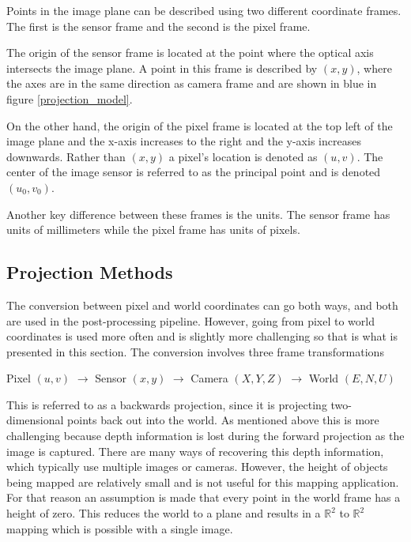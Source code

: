  Points in the image plane can be described using two different coordinate frames.  The first is the sensor frame and the second is the pixel frame.  
 
 The origin of the sensor frame is located at the point where the optical axis intersects the image plane.  A point in this frame is described by $(x,y)$, where the axes are in the same direction as camera frame and are shown in blue in figure \ref{projection_model}.  
 
 On the other hand, the origin of the pixel frame is located at the top left of the image plane and the x-axis increases to the right and the y-axis increases downwards.  Rather than $(x,y)$ a pixel's location is denoted as $(u,v)$.  The center of the image sensor is referred to as the principal point and is denoted $(u_0,v_0)$.
 
 Another key difference between these frames is the units.  The sensor frame has units of millimeters while the pixel frame has units of pixels.

 \subsection{Projection Methods}

 The conversion between pixel and world coordinates can go both ways, and both are used in the post-processing pipeline.  However, going from pixel to world coordinates is used more often and is slightly more challenging so that is what is presented in this section. The conversion involves three frame transformations   
\begin{center}
 Pixel $(u,v)$ $\rightarrow$ Sensor $(x,y)$ $\rightarrow$ Camera $(X,Y,Z)$ $\rightarrow$ World $(E,N,U)$
\end{center}
 
 This is referred to as a backwards projection, since it is projecting two-dimensional points back out into the world.  As mentioned above this is more challenging because depth information is lost during the forward projection as the image is captured.  There are many ways of recovering this depth information, which typically use multiple images or cameras.  However, the height of objects being mapped are relatively small and is not useful for this mapping application.  For that reason an assumption is made that every point in the world frame has a height of zero.  This reduces the world to a plane and results in a $\mathbb{R}^2$ to $\mathbb{R}^2$ mapping which is possible with a single image. 
 
